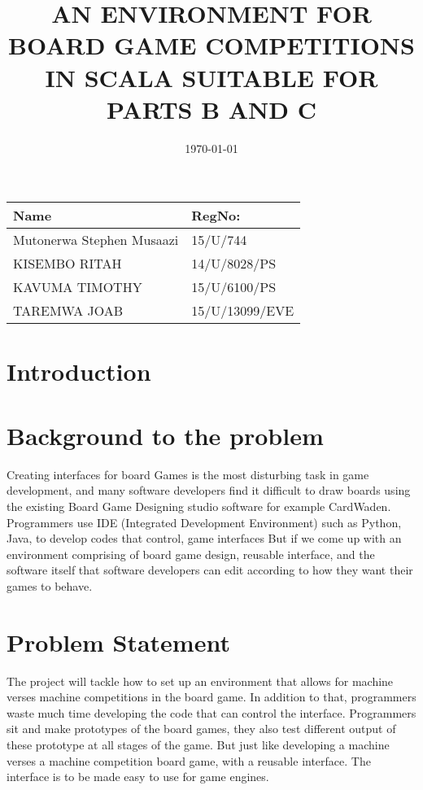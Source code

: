 \documentclass[a4paper,12pt]{article}
\begin{document}
\title{AN ENVIRONMENT FOR BOARD GAME COMPETITIONS IN SCALA SUITABLE FOR PARTS B AND C}
\date{\today}

\begin{tabular}{|l|l|}
\hline
Name & RegNo: \\
\hline
Mutonerwa Stephen Musaazi & 15/U/744 \\
\hline
 KISEMBO RITAH & 14/U/8028/PS \\
\hline
 KAVUMA TIMOTHY	& 15/U/6100/PS \\ 
\hline
 TAREMWA JOAB	& 15/U/13099/EVE \\
\hline
\end{tabular}


\maketitle
{}

\newpage
\section{Introduction}
\section{  Background to the problem}

Creating interfaces for board Games is the most disturbing task in game development, and many software developers find it difficult to draw boards using the existing Board Game Designing  studio software for example CardWaden. 
Programmers use IDE (Integrated Development Environment) such as Python, Java, to develop codes that control, game interfaces
But if we come up with an environment comprising of board game design, reusable interface, and the software itself that software developers can edit according to how they want their games to behave.

\section{ Problem Statement}
The project will tackle how to set up an environment that allows for machine verses machine competitions in the board game.  
In addition to that, programmers waste much time developing the code that can control the interface. Programmers sit and make prototypes of the board games, they also test different output of these prototype at all stages of the game.
But just like developing a machine verses a machine competition board game, with a reusable interface.  The interface is to be made easy to use for game engines.
\end{document}
